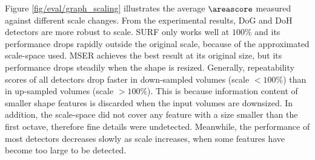 Figure \ref{fig/eval/graph_scaling} illustrates the average $\areascore$ measured against different scale changes. 
From the experimental results, DoG and DoH detectors are more robust to scale. SURF only works well at $100\%$ and its performance drops rapidly outside the original scale, because of the approximated scale-space used. MSER achieves the best result at its original size, but its performance drops steadily when the shape is resized.
Generally, repeatability scores of all detectors drop faster in down-sampled volumes (scale $< 100\%$) than in up-sampled volumes (scale $> 100\%$). 
This is because information content of smaller shape features is discarded when the input volumes are downsized.   
In addition, the scale-space did not cover any feature with a size smaller than the first octave, therefore fine details were undetected.  
Meanwhile, the performance of most detectors decreases slowly as scale increases, when some features have become too large to be detected. 
